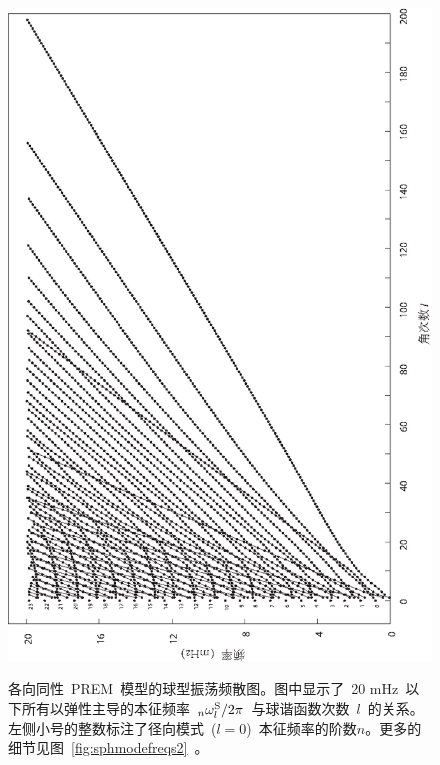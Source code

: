 \begin{figure}
\centering
{}
{
\includegraphics{../figures/chap08/fig09.eps}
}
\caption[sphmodefreqs]{
各向同性~PREM~模型的球型振荡频散图。图中显示了~20 mHz~以下所有以弹性主导的本征频率~${}_n\omega_l^{\rm S}/2\pi$~与球谐函数次数~$l$~的关系。左侧小号的整数标注了径向模式~($l=0$)~本征频率的阶数$n$。更多的细节见图~\ref{fig:sphmodefreqs2}~。
}
\label{fig:sphmodefreqs}
\end{figure}

